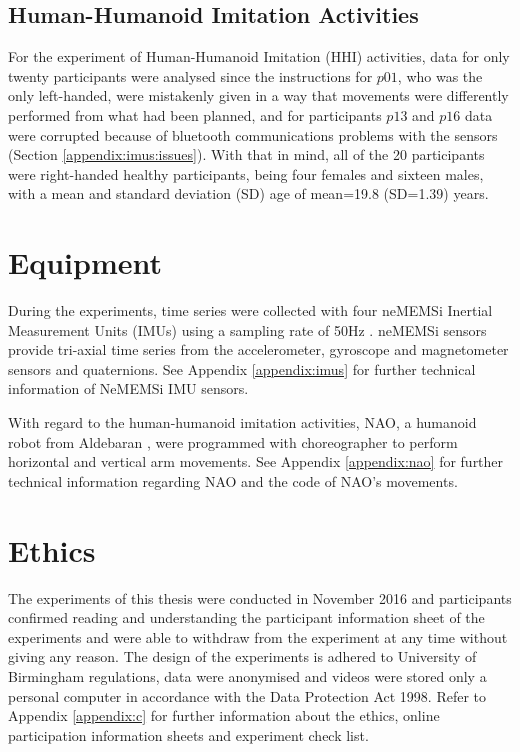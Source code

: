 \subsection{Human-Humanoid Imitation Activities}
For the experiment of Human-Humanoid Imitation (HHI) activities, 
data for only twenty participants were analysed since the instructions 
for $p01$, who was the only left-handed, were mistakenly given in a way 
that movements were differently performed from what had been planned, 
and for participants $p13$ and $p16$ data were corrupted because of  
bluetooth communications problems with the sensors 
(Section \ref{appendix:imus:issues}).
With that in mind, all of the 20 participants were right-handed 
healthy participants, being four females and sixteen males, with 
a mean and standard deviation (SD) age of mean=19.8 (SD=1.39) years.





\section{Equipment}
During the experiments, time series were collected with four neMEMSi 
Inertial Measurement Units (IMUs) using a sampling rate of 50Hz 
\citep{Comotti2014}. neMEMSi sensors provide tri-axial time series from 
the accelerometer, gyroscope and magnetometer sensors and quaternions.
See Appendix \ref{appendix:imus} for further technical information of 
 NeMEMSi IMU sensors.

With regard to the human-humanoid imitation activities, NAO, 
a humanoid robot from Aldebaran \citep{gouaillier2009}, 
were programmed with choreographer to perform horizontal and vertical 
arm movements.
See Appendix \ref{appendix:nao} for further technical information 
regarding NAO and the code of NAO's
movements. 



\section{Ethics}
The experiments of this thesis were conducted in November 2016 and
participants confirmed reading and understanding the participant information 
sheet of the experiments and were able to withdraw from the experiment 
at any time without giving any reason.
The design of the experiments is adhered to University of Birmingham 
regulations, data were anonymised and videos were stored 
only a personal computer in accordance with the Data Protection Act 1998.
Refer to Appendix \ref{appendix:c} for further information about the 
ethics, online participation information sheets and experiment check list.


